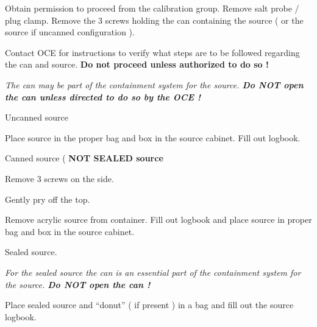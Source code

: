 \begin{enumerate}

\checkitem Obtain permission to proceed from the calibration group.
\checkitem Remove salt probe / plug clamp.
\checkitem Remove the 3 screws holding the can containing the source ( or the source if uncanned configuration ).

\checkitem Contact OCE for instructions to verify what steps are to be followed regarding the can and source.
   {\bf Do not proceed unless authorized to do so !}

\small
{\em  The can may be part of the containment system for the source. {\bf Do NOT open the can unless directed to do so
by the OCE !   }    }
\normalsize 

  \checkitem Uncanned source

\begin{enumerate}

 \checkitem Place source in the proper bag and box in the source cabinet. Fill out logbook.

\end{enumerate}

\checkitem Canned source  ( {\bf NOT SEALED source }

 \begin{enumerate}

 \checkitem Remove 3 screws on the side.

  \checkitem Gently pry off the top.

  \checkitem Remove acrylic source from container. Fill out logbook and place source in proper bag and box in the source cabinet.

\end{enumerate}


\checkitem Sealed source.

\small
{\em  For the sealed source the can is an essential part of the containment system for the source.
 {\bf Do NOT open the can  !   }    }
\normalsize 

\begin{enumerate}

 \checkitem Place sealed source and ``donut'' ( if present ) in a bag and fill out the source logbook.

\end{enumerate}



\end{enumerate}
